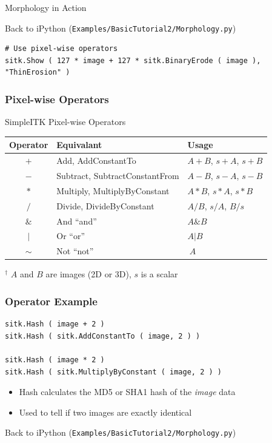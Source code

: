 \begin{frame}{Morphology in Action}
\center
\begin{center}
Back to iPython (\texttt{Examples/BasicTutorial2/Morphology.py})
\end{center}
\end{frame}

\begin{frame}[fragile]
\lstpython
\begin{lstlisting}
# Use pixel-wise operators
sitk.Show ( 127 * image + 127 * sitk.BinaryErode ( image ), "ThinErosion" )
\end{lstlisting}
\frametitle{Pixel-wise Operators}
\begin{threeparttable}
  \caption{SimpleITK Pixel-wise Operators}
  \begin{tabular}{c||l|l}
    Operator & Equivalant & Usage\tnote{$^\dagger$} \\
    \hline
    $+$        & Add, AddConstantTo & $A + B$, $s+A$, $s+B$ \\
    $-$        & Subtract, SubtractConstantFrom & $A - B$, $s-A$, $s-B$ \\
    $*$        & Multiply, MultiplyByConstant & $A * B$, $s*A$, $s*B$ \\
    $/$        & Divide, DivideByConstant & $A / B$, $s/A$, $B/s$ \\
    $\&$        & And ``and'' & $A \& B$ \\
    $|$        & Or ``or'' & $A | B$ \\
    $\sim$        & Not ``not'' & $~A$
  \end{tabular}
  \begin{tablenotes}
    \item[$^\dagger$] $A$ and $B$ are images (2D or 3D), $s$ is a scalar
  \end{tablenotes}
\end{threeparttable}
\end{frame}

\begin{frame}[fragile]
\frametitle{Operator Example}
\lstpython
\begin{lstlisting}
sitk.Hash ( image + 2 )
sitk.Hash ( sitk.AddConstantTo ( image, 2 ) )

sitk.Hash ( image * 2 )
sitk.Hash ( sitk.MultiplyByConstant ( image, 2 ) )
\end{lstlisting}

\begin{itemize}
  \item Hash calculates the MD5 or SHA1 hash of the \textit{image} data
  \item Used to tell if two images are exactly identical
\end{itemize}
Back to iPython (\texttt{Examples/BasicTutorial2/Morphology.py})
\end{frame}


